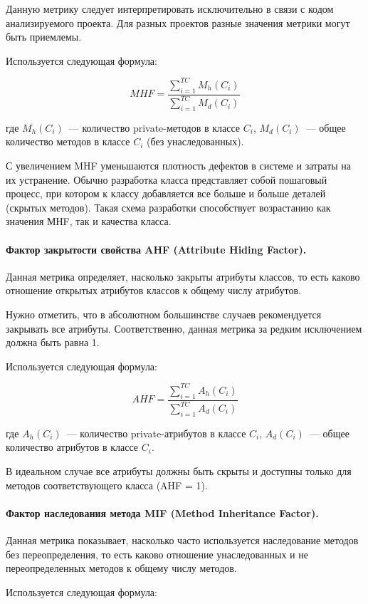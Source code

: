 \documentclass{../../text-style}
\begin{document}
Данную метрику следует интерпретировать исключительно в связи с кодом анализируемого проекта. Для разных проектов разные значения метрики могут быть приемлемы.

Используется следующая формула:

$$MHF = \frac{\sum\limits_{i=1}^{TC}M_h(C_i)}{\sum\limits_{i=1}^{TC}M_d(C_i)}$$

где $M_h(C_i)$~--- количество private-методов в классе $C_i$, $M_d(C_i)$~--- общее количество методов в классе $C_i$ (без унаследованных).

С увеличением MHF уменьшаются плотность дефектов в системе и затраты на их устранение. Обычно разработка класса представляет собой пошаговый процесс, при котором к классу добавляется все больше и больше деталей (скрытых методов). Такая схема разработки способствует возрастанию как значения МНF, так и качества класса.

\paragraph{Фактор закрытости свойства AHF (Attribute Hiding Factor).} Данная метрика определяет, насколько закрыты атрибуты классов, то есть каково отношение открытых атрибутов классов к общему числу атрибутов.

Нужно отметить, что в абсолютном большинстве случаев рекомендуется закрывать все атрибуты. Соответственно, данная метрика за редким исключением должна быть равна 1.

Используется следующая формула:

$$AHF = \frac{\sum\limits_{i=1}^{TC}A_h(C_i)}{\sum\limits_{i=1}^{TC}A_d(C_i)}$$

где $A_h(C_i)$~--- количество private-атрибутов в классе $C_i$, $A_d(C_i)$~--- общее количество атрибутов в классе $C_i$.

В идеальном случае все атрибуты должны быть скрыты и доступны только для методов соответствующего класса (AHF = 1).

\paragraph{Фактор наследования метода MIF (Method Inheritance Factor).} Данная метрика показывает, насколько часто используется наследование методов без переопределения, то есть каково отношение унаследованных и не переопределенных методов к общему числу методов.

Используется следующая формула:
\end{document}
